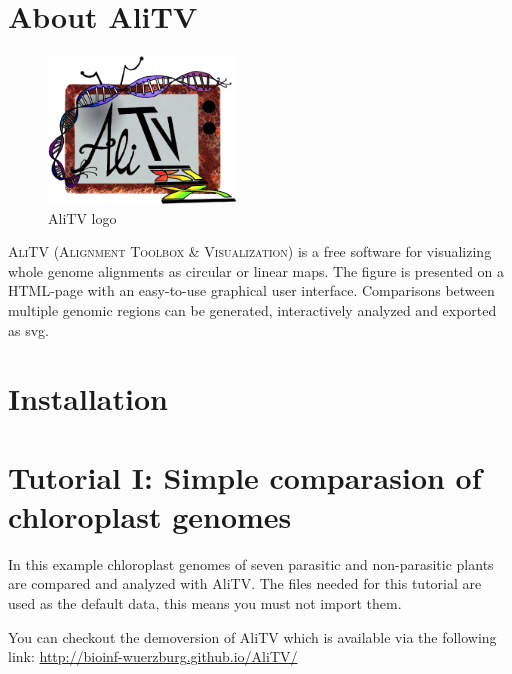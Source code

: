 \documentclass[a4paper]{scrartcl}
\begin{document}
\newpage
\section*{About AliTV}
\begin{figure}
\centering
\includegraphics[width=5cm]{ali_logo2.png}
\caption{AliTV logo}
\end{figure}

\textsc{AliTV} (\textsc{Alignment Toolbox \& Visualization}) is a free software for visualizing whole genome alignments as circular or linear maps. The figure is presented on a HTML-page with an easy-to-use graphical user interface. Comparisons between multiple genomic regions can be generated, interactively analyzed and exported as svg. 

\section*{Installation}
\newpage
\section*{Tutorial I: Simple comparasion of chloroplast genomes}
In this example chloroplast genomes of seven parasitic and non-parasitic plants are compared and analyzed with AliTV. The files needed for this tutorial are used as the default data, this means you must not import them.

You can checkout the demoversion of AliTV which is available via the following link: \url{http://bioinf-wuerzburg.github.io/AliTV/}
\end{document}
